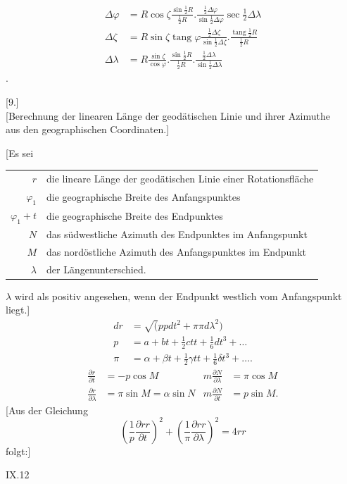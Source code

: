 \clearpage
\noindent\makebox[12mm][l]{}\par\medskip
\[
\begin{aligned}
\Delta\varphi&=R\cos\zeta\frac{\sin\tfrac12R}{\tfrac12R}.
\frac{\tfrac12\Delta\varphi}{\sin\tfrac12\Delta\varphi}\sec\tfrac12\Delta\lambda\\[1ex]
\Delta\zeta&=R\sin\zeta\operatorname{tang}\varphi\frac{\tfrac12\Delta\zeta}{\sin\tfrac12\Delta\zeta}.
\frac{\operatorname{tang}\tfrac12R}{\tfrac12R}\\[1ex]
\Delta\lambda&=R\frac{\sin\zeta}{\cos\varphi}.\frac{\sin\tfrac12R}{\tfrac12R}.
\frac{\tfrac12\Delta\lambda}{\sin\tfrac12\Delta\lambda}
\end{aligned}
\]
.
\begin{center}[9.]\\[1ex]
[Berechnung der linearen Länge der geodätischen Linie und ihrer Azimuthe\\
aus den geographischen Coordinaten.]
\end{center}
[Es sei
\begin{center}
\begin{tabular}{r@{\quad}p{.87\linewidth}}
\(r\)&die lineare Länge der geodätischen Linie einer Rotationsfläche\\
\(\varphi_1\)&die geographische Breite des Anfangspunktes\\
\(\varphi_1+t\)&die geographische Breite des Endpunktes\\
\(N\)&das südwestliche Azimuth des Endpunktes im Anfangspunkt\\
\(M\)&das nordöstliche Azimuth des Anfangspunktes im Endpunkt\\
\(\lambda\)&der Längenunterschied.
\end{tabular}
\end{center}
\noindent\(\lambda\) wird als positiv angesehen, wenn der Endpunkt westlich vom Anfangspunkt liegt.]
\[
\begin{aligned}
dr&=\surd(ppdt^2+\pi\pi d\lambda^2)\\
p&=a+bt+\tfrac12ctt+\tfrac16dt^3+\ldots\\
\pi&=\alpha+\beta t+\tfrac12\gamma tt+\tfrac16\delta t^3+\ldots.
\end{aligned}
\]
\[
\begin{aligned}
\frac{\partial r}{\partial t}&=-p\cos M&
m\frac{\partial N}{\partial\lambda}&=\pi\cos M\\
\frac{\partial r}{\partial\lambda}&=\pi\sin M=\alpha\sin N&
m\frac{\partial N}{\partial t}&=p\sin M.
\end{aligned}
\]
[Aus der Gleichung
\[
\left(\frac1p\frac{\partial rr}{\partial t}\right)^2+
\left(\frac1\pi\frac{\partial rr}{\partial\lambda}\right)^2=4rr
\]
\noindent folgt:]
\par\vfill\noindent IX.\hfill12

